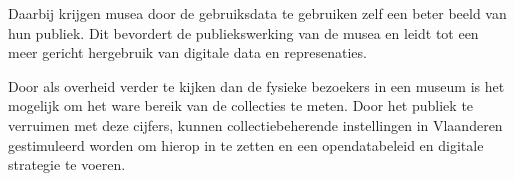 \documentclass[fleqn,10pt]{voorstel}
\begin{document}
Daarbij krijgen musea door de gebruiksdata te gebruiken zelf een beter beeld van hun publiek. Dit bevordert de publiekswerking van de musea en leidt tot een meer gericht hergebruik van digitale data en represenaties.

Door als overheid verder te kijken dan de fysieke bezoekers in een museum is het mogelijk om het ware bereik van de collecties te meten. Door het publiek te verruimen met deze cijfers, kunnen collectiebeherende instellingen in Vlaanderen gestimuleerd worden om hierop in te zetten en een opendatabeleid en digitale strategie te voeren.


\printbibliography[heading=bibintoc]
\end{document}
